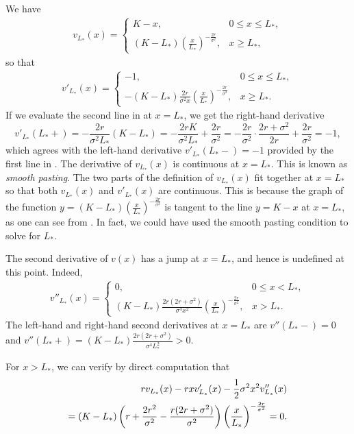 We have
\begin{align} \label{eq:PiecewiseValue}
	v_{L_*}(x) = \begin{cases} K - x, & 0 \le x \le L_*, \\ (K - L_*) \left( \frac{x}{L_*} \right)^{-\frac{2r}{\sigma^2}}, & x \ge L_*, \end{cases}
\end{align}
so that
\begin{align} \label{eq:PiecewiseDerivative}
	v'_{L_*}(x) = \begin{cases} -1, & 0 \le x \le L_*, \\ -(K - L_*) \frac{2r}{\sigma^2 x} \left( \frac{x}{L_*} \right)^{-\frac{2r}{\sigma^2}}, & x \ge L_*. \end{cases}
\end{align}
If we evaluate the second line in  at \(x = L_*\), we get the right-hand derivative
\[
	v'_{L_*}(L_*+) = - \frac{2r}{\sigma^2 L_*} (K - L_*) = - \frac{2rK}{\sigma^2 L_*} + \frac{2r}{\sigma^2} = - \frac{2r}{\sigma^2} \cdot \frac{2r + \sigma^2}{2r} + \frac{2r}{\sigma^2} = -1,
\]
which agrees with the left-hand derivative \(v'_{L_*}(L_*-) = -1\) provided by the first line in . The derivative of \(v_{L_*}(x)\) is continuous at \(x = L_*\). This is known as \textit{smooth pasting}. The two parts of the definition of \(v_{L_*}(x)\) fit together at \(x = L_*\) so that both \(v_{L_*}(x)\) and \(v'_{L_*}(x)\) are continuous. This is because the graph of the function \(y = (K - L_*)(\frac{x}{L_*})^{-\frac{2r}{\sigma^2}}\) is tangent to the line \(y = K - x\) at \(x = L_*\), as one can see from . In fact, we could have used the smooth pasting condition to solve for \(L_*\).

The second derivative of \(v(x)\) has a jump at \(x = L_*\), and hence is undefined at this point. Indeed,
\begin{align} \label{eq:PiecewiseSecondDeriv}
	v''_{L_*}(x) = \begin{cases} 0, & 0 \le x < L_*, \\ (K - L_*) \frac{2r(2r + \sigma^2)}{\sigma^4 x^2} \left( \frac{x}{L_*} \right)^{-\frac{2r}{\sigma^2}}, & x > L_*. \end{cases}
\end{align}
The left-hand and right-hand second derivatives at \(x = L_*\) are \(v''(L_*-) = 0\) and \(v''(L_*+) = (K - L_*) \frac{2r(2r+\sigma^2)}{\sigma^4 L_*^2} > 0\).

For \(x > L_*\), we can verify by direct computation that
\begin{align} \label{eq:OperatorCheckActionRegion}
	rv_{L_*}(x) - rxv'_{L_*}(x) - \frac{1}{2}\sigma^2 x^2 v''_{L_*}(x) \notag \\
	= (K - L_*) \left( r + \frac{2r^2}{\sigma^2} - \frac{r(2r + \sigma^2)}{\sigma^2} \right) \left( \frac{x}{L_*} \right)^{-\frac{2r}{\sigma^2}} = 0.
\end{align}

